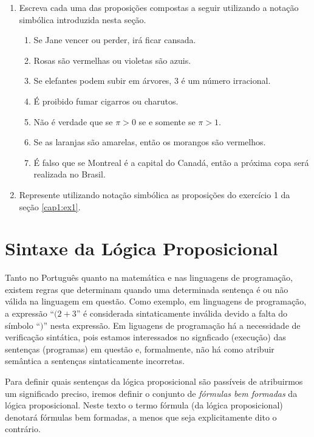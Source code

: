 \begin{enumerate}
  \item Escreva cada uma das proposi\c{c}\~oes compostas a seguir utilizando a nota\c{c}\~ao simb\'olica introduzida nesta se\c{c}\~ao.
  \begin{enumerate}
    \item Se Jane vencer ou perder, ir\'a ficar cansada.
    \item Rosas s\~ao vermelhas ou violetas s\~ao azuis.
    \item Se elefantes podem subir em \'arvores, 3 \'e um n\'umero irracional.
    \item \'E proibido fumar cigarros ou charutos.
    \item N\~ao \'e verdade que se $\pi > 0$ se e somente se $\pi > 1$.
    \item Se as laranjas s\~ao amarelas, ent\~ao os morangos s\~ao vermelhos.
    \item \'E falso que se Montreal \'e a capital do Canad\'a, ent\~ao a pr\'oxima copa ser\'a realizada no Brasil.
  \end{enumerate}
  \item Represente utilizando nota\c{c}\~ao simb\'olica as proposi\c{c}\~oes do exerc\'icio 1 da se\c{c}\~ao \ref{cap1:ex1}.
\end{enumerate}

\section{Sintaxe da L\'ogica Proposicional}

Tanto no Portugu\^es quanto na matem\'atica e nas linguagens de programa\c{c}\~ao, existem regras que determinam quando uma determinada
senten\c{c}a \'e ou n\~ao v\'alida na linguagem em quest\~ao. Como exemplo, em linguagens de programa\c{c}\~ao, a express\~ao ``$(2 + 3$'' \'e
considerada sintaticamente inv\'alida devido a falta do s\'imbolo ``$)$'' nesta express\~ao. Em liguagens de programa\c{c}\~ao h\'a a necessidade
de verifica\c{c}\~ao sint\'atica, pois estamos interessados no signficado (execu\c{c}\~ao) das senten\c{c}as (programas) em quest\~ao e,
formalmente, n\~ao h\'a como atribuir sem\^antica a senten\c{c}as sintaticamente incorretas.

Para definir quais senten\c{c}as da l\'ogica proposicional s\~ao pass\'iveis de atribuirmos um significado preciso, iremos definir o conjunto
de \textit{f\'ormulas bem formadas} da l\'ogica proposicional. Neste texto o termo f\'ormula (da l\'ogica proposicional) denotar\'a f\'ormulas
bem formadas, a menos que seja explicitamente dito o contr\'ario.

